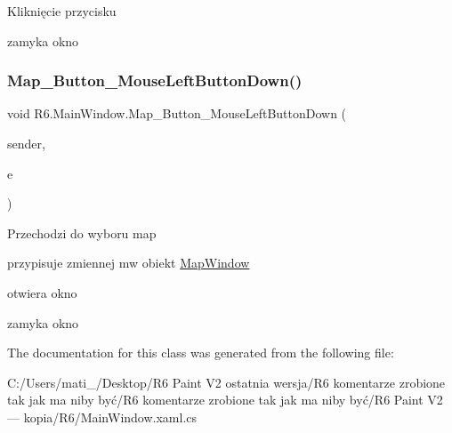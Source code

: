 Kliknięcie przycisku 

zamyka okno \mbox{\label{class_r6_1_1_main_window_a4c5be45f6208989f5ff9b7896d0fda78}} 
\subsubsection{\texorpdfstring{Map\_Button\_MouseLeftButtonDown()}{Map\_Button\_MouseLeftButtonDown()}}
{\footnotesize\ttfamily void R6.\+Main\+Window.\+Map\+\_\+\+Button\+\_\+\+Mouse\+Left\+Button\+Down (\begin{DoxyParamCaption}\item[{object}]{sender,  }\item[{Mouse\+Button\+Event\+Args}]{e }\end{DoxyParamCaption})\hspace{0.3cm}{\ttfamily [private]}}



Przechodzi do wyboru map 

przypisuje zmiennej mw obiekt \mbox{\hyperlink{class_r6_1_1_map_window}{Map\+Window}} 

otwiera okno 

zamyka okno 

The documentation for this class was generated from the following file\+:\begin{DoxyCompactItemize}
\item 
C\+:/\+Users/mati\+\_\+/\+Desktop/\+R6 Paint V2 ostatnia wersja/\+R6 komentarze zrobione tak jak ma niby być/\+R6 komentarze zrobione tak jak ma niby być/\+R6 Paint V2 — kopia/\+R6/Main\+Window.\+xaml.\+cs\end{DoxyCompactItemize}
